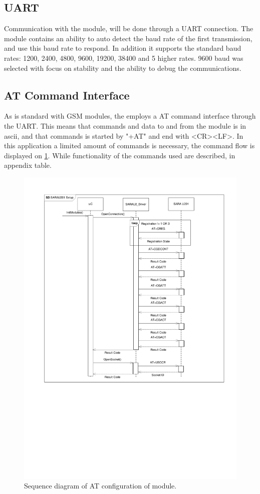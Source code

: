 \subsection{UART}
Communication with the \SARA module, will be done through a UART connection. The module contains an ability to auto detect the baud rate of the first transmission, and use this baud rate to respond. In addition it supports the standard baud rates: \num{1200}, \num{2400}, \num{4800}, \num{9600}, \num{19200}, \num{38400} and 5 higher rates. \num{9600} baud was selected with focus on stability and the ability to debug the communications.

\subsection{AT Command Interface}
As is standard with GSM modules, the \SARA employs a AT command interface through the UART. This means that commands and data to and from the module is in ascii, and that commands is started by "+AT" and end with <CR><LF>. In this application a limited amount of commands is necessary, the command flow is displayed on \cref{fig:SD:configConnection}. While functionality of the commands used are described, in appendix table. 

\begin{figure}
	\centering
	\includegraphics[width=0.9\linewidth]{gfx/Design/GSMSetupConnection.pdf}
	\caption{Sequence diagram of AT configuration of \SARA module.}
	\label{fig:SD:configConnection}
\end{figure}

